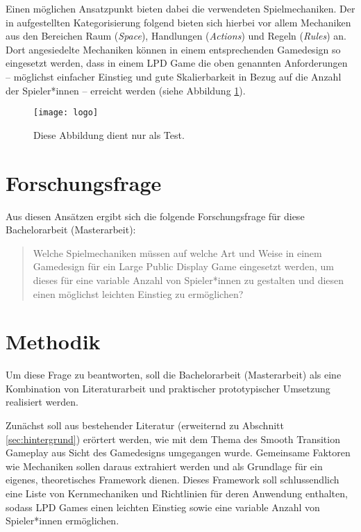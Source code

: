 Einen möglichen Ansatzpunkt bieten dabei die verwendeten Spielmechaniken. Der
in \cite{Schell2019} aufgestellten Kategorisierung folgend bieten sich hierbei 
vor allem Mechaniken aus den Bereichen Raum (\emph{Space}), Handlungen
(\emph{Actions}) und Regeln (\emph{Rules}) an. Dort angesiedelte Mechaniken
können in einem entsprechenden Gamedesign so eingesetzt werden, dass in einem
LPD Game die oben genannten Anforderungen -- möglichst einfacher Einstieg und
gute Skalierbarkeit in Bezug auf die Anzahl der Spieler*innen -- erreicht
werden (siehe Abbildung \ref{fig:logo}). %

\begin{figure}
	\centering
	\texttt{[image: logo]}
	\caption{Diese Abbildung dient nur als Test.}
	\label{fig:logo}
\end{figure}

\section{Forschungsfrage}

Aus diesen Ansätzen ergibt sich die folgende Forschungsfrage für diese
Bachelorarbeit (Masterarbeit):
%
\begin{quote}
	Welche Spielmechaniken müssen auf welche Art und Weise in einem
	Game\-design für ein Large Public Display Game eingesetzt werden, um
	dieses für eine variable Anzahl von Spieler*innen zu gestalten und diesen
	einen möglichst leichten Einstieg zu ermöglichen?
\end{quote}


\section{Methodik}

Um diese Frage zu beantworten, soll die Bachelorarbeit (Masterarbeit) als eine
Kombination von Literaturarbeit und praktischer \bzw prototypischer Umsetzung
realisiert werden.

Zunächst soll aus bestehender Literatur (erweiternd zu Abschnitt
\ref{sec:hintergrund}) erörtert werden, wie mit dem Thema des Smooth
Transition Gameplay aus Sicht des Gamedesigns umgegangen wurde. Gemeinsame
Faktoren wie Mechaniken sollen daraus extrahiert werden und als Grundlage für
ein eigenes, theoretisches Framework dienen. Dieses Framework soll
schlussendlich eine Liste von Kernmechaniken und Richtlinien für deren
Anwendung enthalten, sodass LPD Games einen leichten Einstieg sowie eine
variable Anzahl von Spieler*innen ermöglichen.

